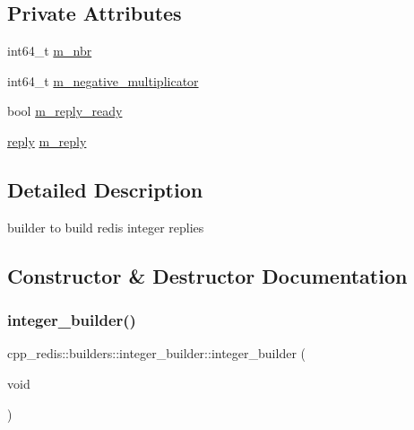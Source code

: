 \subsection*{Private Attributes}
\begin{DoxyCompactItemize}
\item 
int64\+\_\+t \hyperlink{classcpp__redis_1_1builders_1_1integer__builder_af3b37f54856e09f45fdd8c9f0443d8a7}{m\+\_\+nbr}
\item 
int64\+\_\+t \hyperlink{classcpp__redis_1_1builders_1_1integer__builder_ae1c6d8b48c44f022e9dea4718a4ae25f}{m\+\_\+negative\+\_\+multiplicator}
\item 
bool \hyperlink{classcpp__redis_1_1builders_1_1integer__builder_ab2e676e8e881987fe56847bf992a7a09}{m\+\_\+reply\+\_\+ready}
\item 
\hyperlink{classcpp__redis_1_1reply}{reply} \hyperlink{classcpp__redis_1_1builders_1_1integer__builder_a0c9b1dc87ca9f0cb9576283fe5482548}{m\+\_\+reply}
\end{DoxyCompactItemize}


\subsection{Detailed Description}
builder to build redis integer replies 

\subsection{Constructor \& Destructor Documentation}
\mbox{\label{classcpp__redis_1_1builders_1_1integer__builder_a9ff2d3d27da0fb8b98fc4a0ea255fece}} 
\subsubsection{\texorpdfstring{integer\+\_\+builder()}{integer\_builder()}\hspace{0.1cm}{\footnotesize\ttfamily [1/2]}}
{\footnotesize\ttfamily cpp\+\_\+redis\+::builders\+::integer\+\_\+builder\+::integer\+\_\+builder (\begin{DoxyParamCaption}\item[{void}]{ }\end{DoxyParamCaption})}



